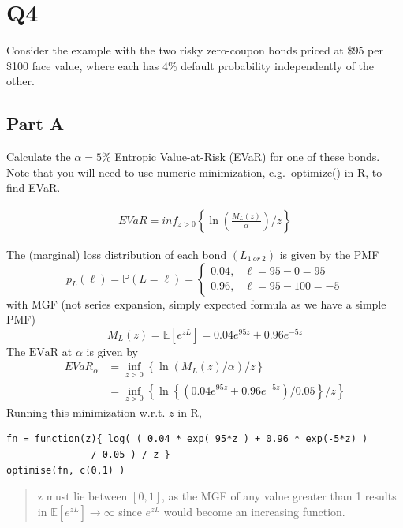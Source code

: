 \documentclass[
  oneside]{book}
\begin{document}
\hypertarget{q4-4}{%
\section{Q4}\label{q4-4}}

Consider the example with the two risky zero-coupon bonds priced at \$95 per \$100 face value, where each has 4\% default probability independently of the other.

\hypertarget{part-a-12}{%
\subsection{Part A}\label{part-a-12}}

Calculate the \(\alpha = 5\%\) Entropic Value-at-Risk (EVaR) for one of these bonds. Note that you will need to use numeric minimization, e.g.~optimize() in R, to find EVaR.

\[
\begin{aligned}
EVaR = inf_{z > 0}\left\{ \ln\left( \frac{M_{L}(z)}{\alpha} \right)/z \right\}
\end{aligned}
\]

The (marginal) loss distribution of each bond \(\left(L_{1 \ or\ 2}\right)\) is given by the PMF
\[
p_L(\ell)=\mathbb{P}(L=\ell)= \begin{cases}0.04, & \ell=95-0=95 \\ 0.96, & \ell=95-100=-5\end{cases}
\]
with MGF (not series expansion, simply expected formula as we have a simple PMF)
\[
M_L(z)=\mathbb{E}\left[e^{z L}\right]=0.04 e^{95 z}+0.96 e^{-5 z}
\]
The \(\mathrm{EVaR}\) at \(\alpha\) is given by
\[
\begin{aligned}
E V a R_\alpha & =\inf _{z>0}\left\{\ln \left(M_L(z) / \alpha\right) / z\right\} \\
& =\inf _{z>0}\left\{\ln \left\{\left(0.04 e^{95 z}+0.96 e^{-5 z}\right) / 0.05\right\} / z\right\}
\end{aligned}
\]
Running this minimization w.r.t. \(z\) in \(\mathrm{R}\),

\begin{verbatim}
fn = function(z){ log( ( 0.04 * exp( 95*z ) + 0.96 * exp(-5*z) )
               / 0.05 ) / z }
optimise(fn, c(0,1) )
\end{verbatim}

\begin{quote}
z must lie between \([0,1]\), as the MGF of any value greater than 1 results in \(\mathbb{E}[e^{zL}] \to \infty\) since \(e^{zL}\) would become an increasing function.
\end{quote}
\end{document}

